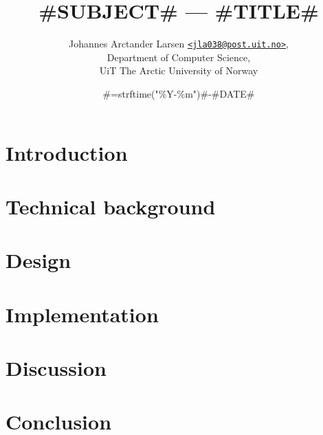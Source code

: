 \documentclass[english,a4paper,10pt]{article}
\makeatletter
\newcommand{\documentdate}{#=strftime("\%Y-\%m")#-#DATE#}
\newcommand{\documentauthorname}{Johannes Arctander Larsen}
\newcommand{\documentauthormail}{jla038@post.uit.no}
\newcommand{\documentauthor}{\documentauthorname{} \href{mailto:\documentauthormail}{\texttt{<\documentauthormail>}}}
\newcommand{\documentdepartment}{Department of Computer Science}
\newcommand{\documentinstitution}{UiT The Arctic University of Norway}
\newcommand{\documentinstitute}{\documentdepartment, \\ \documentinstitution}
\newcommand{\documenttitle}{#SUBJECT# --- #TITLE#}
\makeatother
\begin{document}
\title{\documenttitle}
\date{\documentdate}
\author{
	\documentauthor,\\
	\documentinstitute
}
\maketitle

\section{Introduction}
\section{Technical background}
\section{Design}
\section{Implementation}
\section{Discussion}
\section{Conclusion}


\end{document}
